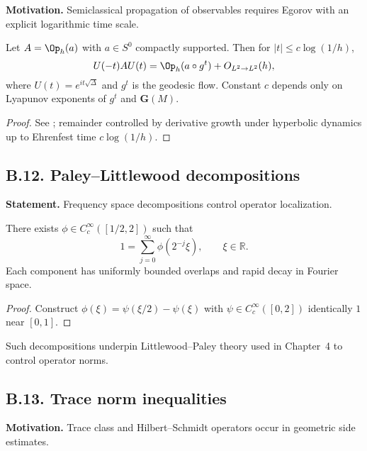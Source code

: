 \noindent
\textbf{Motivation.}
Semiclassical propagation of observables requires Egorov with an explicit logarithmic time scale.

\begin{lemma}\label{lem:B-egorov}
Let $A=\Op_h(a)$ with $a\in S^0$ compactly supported. Then for $|t|\le c\log(1/h)$,
\[
U(-t)AU(t)=\Op_h(a\circ g^t)+O_{L^2\to L^2}(h),
\]
where $U(t)=e^{it\sqrt{\Delta}}$ and $g^t$ is the geodesic flow. Constant $c$ depends only on Lyapunov exponents of $g^t$ and $\mathbf{G}(M)$.
\end{lemma}

\begin{proof}
See \cite[Chap.~11]{Zworski2012}; remainder controlled by derivative growth under hyperbolic dynamics up to Ehrenfest time $c\log(1/h)$.
\end{proof}

\bigskip
\subsection*{B.12. Paley–Littlewood decompositions}

\noindent
\textbf{Statement.}
Frequency space decompositions control operator localization.

\begin{lemma}\label{lem:B-PL}
There exists $\phi\in C_c^\infty([1/2,2])$ such that
\[
1=\sum_{j=0}^\infty \phi(2^{-j}\xi),\qquad \xi\in\mathbb{R}.
\]
Each component has uniformly bounded overlaps and rapid decay in Fourier space.
\end{lemma}

\begin{proof}
Construct $\phi(\xi)=\psi(\xi/2)-\psi(\xi)$ with $\psi\in C_c^\infty([0,2])$ identically $1$ near $[0,1]$.
\end{proof}

\begin{remark}[Application]\label{rem:B-PL}
Such decompositions underpin Littlewood–Paley theory used in Chapter~4 to control operator norms.
\end{remark}

\bigskip
\subsection*{B.13. Trace norm inequalities}

\noindent
\textbf{Motivation.}
Trace class and Hilbert–Schmidt operators occur in geometric side estimates.

